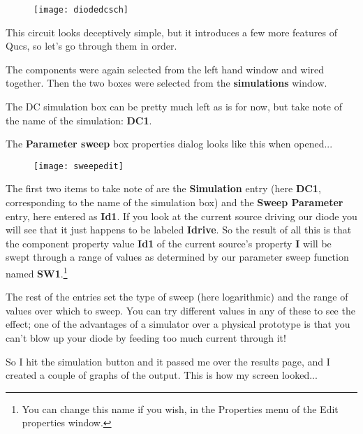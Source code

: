 \begin{figure}[ht]
  \centering
  \texttt{[image: diodedcsch]}
  \label{fig:diodedcsch}
\end{figure}
\FloatBarrier

This circuit looks deceptively simple, but it introduces a few more
features of Qucs, so let's go through them in order.

\addvspace{12pt}

The components were again selected from the left hand window and wired
together. Then the two boxes were selected from the
\textbf{simulations} window.

\addvspace{12pt}

The DC simulation box can be pretty much left as is for now, but take
note of the name of the simulation: \textbf{DC1}.

\addvspace{12pt}

The \textbf{Parameter sweep} box properties dialog looks like this
when opened...

\begin{figure}[ht]
  \centering
  \texttt{[image: sweepedit]}
  \label{fig:sweepedit}
\end{figure}
\FloatBarrier

The first two items to take note of are the \textbf{Simulation} entry
(here \textbf{DC1}, corresponding to the name of the simulation box)
and the \textbf{Sweep Parameter} entry, here entered as \textbf{Id1}.
If you look at the current source driving our diode you will see that
it just happens to be labeled \textbf{Idrive}.  So the result of all
this is that the component property value \textbf{Id1} of the current
source's property \textbf{I} will be swept through a range of values
as determined by our parameter sweep function named
\textbf{SW1}.\footnote{You can change this name if you wish, in the
Properties menu of the Edit properties window.}

\addvspace{12pt}

The rest of the entries set the type of sweep (here logarithmic) and
the range of values over which to sweep. You can try different values
in any of these to see the effect; one of the advantages of a
simulator over a physical prototype is that you can't blow up your
diode by feeding too much current through it!

\addvspace{12pt}

So I hit the simulation button and it passed me over the results page,
and I created a couple of graphs of the output.  This is how my screen
looked...

